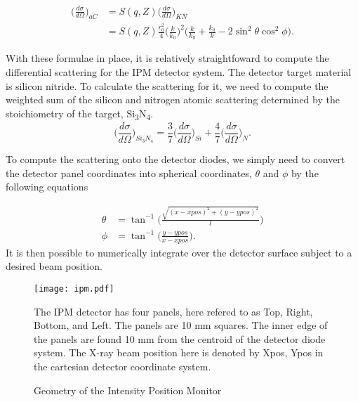 \documentclass{report}
\begin{document}
\begin{equation}
\begin{aligned}
\bigg( \frac {d\sigma}{d\Omega} \bigg)_{aC} &= S(q, Z) \bigg( \frac {d\sigma}{d\Omega} \bigg)_{KN} \\
                                            &= S(q, Z)  \frac {r_0^2} {4} \bigg(\frac{k}{k_0}\bigg)^2\bigg(\frac {k} {k_0} + \frac {k_0} {k} - 2 \sin^2 \theta \cos^2 \phi \bigg).
\end{aligned}
\end{equation}

With these formulae in place, it is relatively straightfoward to compute the differential scattering for the IPM detector system. 
The detector target material is silicon nitride. 
To calculate the scattering for it, we need to compute the weighted sum of the silicon and nitrogen atomic scattering determined by the stoichiometry of the target, Si\textsubscript{3}N\textsubscript{4}.
\begin{equation}
\bigg( \frac {d\sigma}{d\Omega} \bigg)_{Si_3N_4} = \frac{3}{7}\bigg( \frac {d\sigma}{d\Omega} \bigg)_{Si} + \frac{4}{7}\bigg( \frac {d\sigma}{d\Omega} \bigg)_{N}.
\end{equation}

To compute the scattering onto the detector diodes, we simply need to convert the detector panel coordinates into spherical coordinates, $\theta$ and $\phi$ by the following equations

\begin{equation}
\begin{aligned}
\theta &= \tan^{-1} {\bigg( \frac {\sqrt{(x-xpos)^2 + (y-ypos)^2}} {l} \bigg)} \\
\phi   &= \tan^{-1} \bigg(\frac {y - ypos} {x - xpos} \bigg).
\end{aligned}
\end{equation}
It is then possible to numerically integrate over the detector surface subject to a desired beam position. 


\begin{figure}
\centering
\texttt{[image: ipm.pdf]}
\caption{Geometry of the Intensity Position Monitor}
\label{ipm}
The IPM detector has four panels, here refered to as Top, Right, Bottom, and Left. The panels are 10 mm squares. The inner edge of the panels are found 10 mm from the centroid of the detector diode system. The X-ray beam position here is denoted by Xpos, Ypos in the cartesian detector coordinate system.  
\end{figure}
\end{document}
